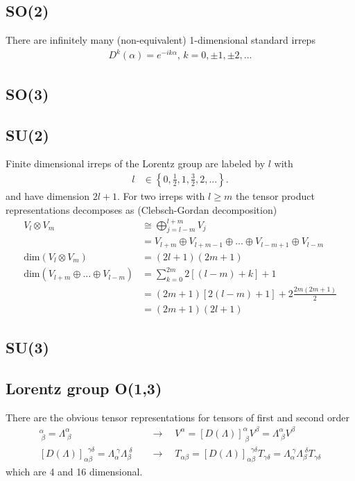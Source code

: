 \documentclass[10pt,a4paper]{article}
\theoremstyle{definition}
\begin{document}
\subsection{SO(2)}
There are infinitely many (non-equivalent) 1-dimensional standard irreps
\begin{align}
    D^{k}(\alpha)=e^{-ik\alpha},\,k=0,\pm1,\pm2,...
\end{align}

\subsection{SO(3)}

\subsection{SU(2)}
Finite dimensional irreps of the Lorentz group are labeled by $l$ with
\begin{align}
    l &\in \left\{0,\frac{1}{2},1,\frac{3}{2},2,...\right\}.
\end{align}
and have dimension $2l+1$. For two irreps with $l\ge m$ the tensor product representations decomposes as ({\sc Clebsch-Gordan} decomposition)
\begin{align}
    V_l \otimes V_m &\cong \bigoplus_{j=l-m}^{l+m} V_j\\
    &=V_{l+m}\oplus V_{l+m-1}\oplus ... \oplus V_{l-m+1}\oplus V_{l-m}\\
    \text{dim}(V_l \otimes V_m)&=(2l+1)(2m+1)\\
    \text{dim}(V_{l+m} \oplus ...\oplus V_{l-m})&=\sum_{k=0}^{2m}2[(l-m)+k]+1\\
    &=(2m+1)[2(l-m)+1]+2\frac{2m(2m+1)}{2}\\
    &=(2m+1)(2l+1)
\end{align}

\subsection{SU(3)}

\subsection{Lorentz group O(1,3)}
There are the obvious tensor representations for tensors of first and second order
\begin{align}
    [D(\Lambda)]^\alpha_{\;\beta}=\Lambda^\alpha_{\;\beta}\quad &\rightarrow\quad V^\alpha = [D(\Lambda)]^\alpha_{\;\beta} V^\beta=\Lambda^\alpha_{\;\beta} V^\beta\\
    [D(\Lambda)]_{\alpha\beta}^{\;\;\gamma\delta}=\Lambda_\alpha^{\;\gamma}\Lambda_\beta^{\;\delta}\quad&\rightarrow\quad T_{\alpha\beta} = [D(\Lambda)]_{\alpha\beta}^{\;\;\gamma\delta} T_{\gamma\delta}=\Lambda_\alpha^{\;\gamma}\Lambda_\beta^{\;\delta}T_{\gamma\delta}
\end{align}
which are 4 and 16 dimensional.
\end{document}
